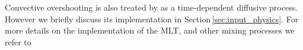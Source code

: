 \documentclass[../../main/thesis_msc.tex]{subfiles}
\begin{document}
					Convective overshooting is also treated by \mesa as a time-dependent diffusive process. However we briefly discuss its implementation in Section\,\ref{sec:input_physics}. For more details on the implementation of the MLT, and other mixing processes we refer to \cite{Paxton2011, Paxton:2013pj}
					
									
    
\end{document}
